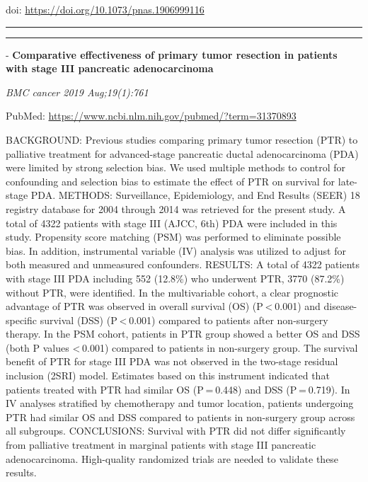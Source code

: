 \documentclass[]{article}
\begin{document}
doi: \url{https://doi.org/10.1073/pnas.1906999116}

{}

{}

\begin{center}\rule{0.5\linewidth}{\linethickness}\end{center}

\begin{center}\rule{0.5\linewidth}{\linethickness}\end{center}

 - \textbf{Comparative effectiveness of primary tumor resection in
patients with stage III pancreatic adenocarcinoma}

\emph{BMC cancer 2019 Aug;19(1):761}

PubMed: \url{https://www.ncbi.nlm.nih.gov/pubmed/?term=31370893}

BACKGROUND: Previous studies comparing primary tumor resection (PTR) to
palliative treatment for advanced-stage pancreatic ductal adenocarcinoma
(PDA) were limited by strong selection bias. We used multiple methods to
control for confounding and selection bias to estimate the effect of PTR
on survival for late-stage PDA. METHODS: Surveillance, Epidemiology, and
End Results (SEER) 18 registry database for 2004 through 2014 was
retrieved for the present study. A total of 4322 patients with stage III
(AJCC, 6th) PDA were included in this study. Propensity score matching
(PSM) was performed to eliminate possible bias. In addition,
instrumental variable (IV) analysis was utilized to adjust for both
measured and unmeasured confounders. RESULTS: A total of 4322 patients
with stage III PDA including 552 (12.8\%) who underwent PTR, 3770
(87.2\%) without PTR, were identified. In the multivariable cohort, a
clear prognostic advantage of PTR was observed in overall survival (OS)
(P \textless{} 0.001) and disease-specific survival (DSS)
(P \textless{} 0.001) compared to patients after non-surgery therapy. In
the PSM cohort, patients in PTR group showed a better OS and DSS (both P
values \textless{} 0.001) compared to patients in non-surgery group. The
survival benefit of PTR for stage III PDA was not observed in the
two-stage residual inclusion (2SRI) model. Estimates based on this
instrument indicated that patients treated with PTR had similar OS
(P = 0.448) and DSS (P = 0.719). In IV analyses stratified by
chemotherapy and tumor location, patients undergoing PTR had similar OS
and DSS compared to patients in non-surgery group across all subgroups.
CONCLUSIONS: Survival with PTR did not differ significantly from
palliative treatment in marginal patients with stage III pancreatic
adenocarcinoma. High-quality randomized trials are needed to validate
these results.
\end{document}
